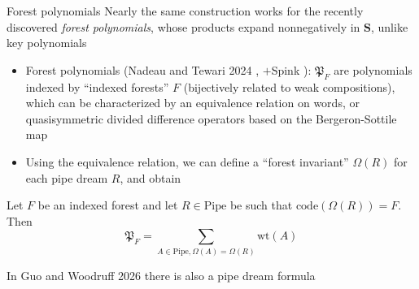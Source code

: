 \documentclass[aspectratio=169]{beamer}
\newcommand{\coma}{\mathbf{S}}
\newcommand{\dcoma}{\mathcal{DS}}
\newcommand{\Forest}[1]{\mathfrak{P}_{#1}}
\newcommand{\RC}{\mathrm{Pipe}}
\begin{document}


\begin{frame}{Forest polynomials}
    Nearly the same construction works for the recently discovered \emph{forest polynomials}, whose products expand nonnegatively in $\coma$, unlike key polynomials
\begin{itemize}
\item Forest polynomials (Nadeau and Tewari 2024 \cite{nadeau2024forest}, $+$Spink \cite{nadeau2024quasisym}): $\Forest{F}$ are polynomials indexed by ``indexed forests'' $F$ (bijectively related to weak compositions), which can be characterized by an equivalence relation on words, or quasisymmetric divided difference operators based on the Bergeron-Sottile map \cite{coprod}
\item Using the equivalence relation, we can define a ``forest invariant'' $\Omega(R)$ for each pipe dream $R$, and obtain
\end{itemize}
\begin{theorem}[S, 2026+]
Let $F$ be an indexed forest and let $R\in\RC$ be such that $\mathrm{code}(\Omega(R))=F$. Then
$$\Forest{F}= \sum_{A\in\RC, \Omega(A) = \Omega(R)} \mathrm{wt}(A)$$
\end{theorem}
In Guo and Woodruff 2026 \cite{guo2026forest} there is also a pipe dream formula
\end{frame}
\end{document}
